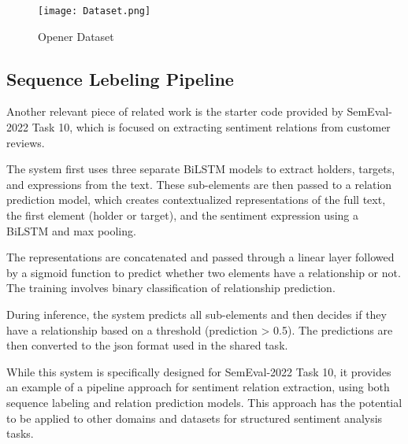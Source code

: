 \begin{figure}
    \centering
    \texttt{[image: Dataset.png]}
    \caption{Opener Dataset}
    \label{fig:Dataset}
\end{figure}

\subsection{Sequence Lebeling Pipeline}

Another relevant piece of related work is the starter code provided by SemEval-2022 Task 10, which is focused on extracting sentiment relations from customer reviews.

The system first uses three separate BiLSTM models to extract holders, targets, and expressions from the text. These sub-elements are then passed to a relation prediction model, which creates contextualized representations of the full text, the first element (holder or target), and the sentiment expression using a BiLSTM and max pooling.

The representations are concatenated and passed through a linear layer followed by a sigmoid function to predict whether two elements have a relationship or not. The training involves binary classification of relationship prediction.

During inference, the system predicts all sub-elements and then decides if they have a relationship based on a threshold (prediction > 0.5). The predictions are then converted to the json format used in the shared task.

While this system is specifically designed for SemEval-2022 Task 10, it provides an example of a pipeline approach for sentiment relation extraction, using both sequence labeling and relation prediction models. This approach has the potential to be applied to other domains and datasets for structured sentiment analysis tasks.
